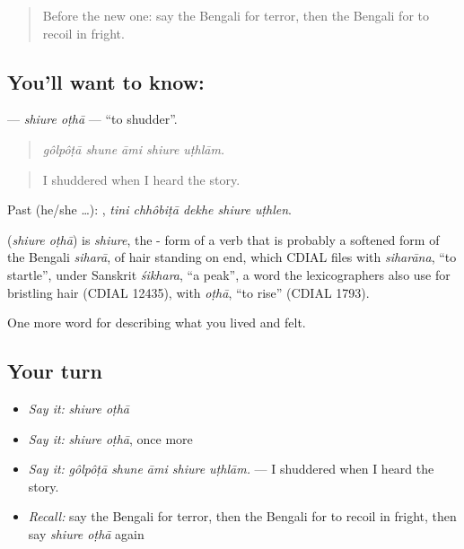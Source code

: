 \label{lesson:BN-C441-shiure-otha}



\begin{quote}
Before the new one: say the Bengali for terror, then the Bengali for to recoil in fright.
\end{quote}

\subsection*{You'll want to know:  }
\textbf{ } — \emph{shiure oṭhā} — \textquotedblleft{}to shudder\textquotedblright{}.

\begin{quote}
    
\end{quote}

\begin{quote}
\emph{gôlpôṭā shune āmi shiure uṭhlām.}
\end{quote}

\begin{quote}
I shuddered when I heard the story.
\end{quote}

Past (he/she …):     , \emph{tini chhôbiṭā dekhe shiure uṭhlen}.

\begin{cousinweb}
\textbf{ } (\emph{shiure oṭhā}) is \emph{shiure}, the - form of a verb that is probably a softened form of the Bengali \emph{siharā}, of hair standing on end, which CDIAL files with \emph{siharāna}, \textquotedblleft{}to startle\textquotedblright{}, under Sanskrit \emph{śikhara}, \textquotedblleft{}a peak\textquotedblright{}, a word the lexicographers also use for bristling hair (CDIAL 12435), with \emph{oṭhā}, \textquotedblleft{}to rise\textquotedblright{} (CDIAL 1793).
\end{cousinweb}

\begin{grammarlens}[title={What you've built}]
One more word for describing what you lived and felt.
\end{grammarlens}

\subsection*{Your turn}
\begin{itemize}
\raggedright
  \item \emph{Say it:} \emph{shiure oṭhā}
  \item \emph{Say it:} \emph{shiure oṭhā}, once more
  \item \emph{Say it:} \emph{gôlpôṭā shune āmi shiure uṭhlām.} — I shuddered when I heard the story.
  \item \emph{Recall:} say the Bengali for terror, then the Bengali for to recoil in fright, then say \emph{shiure oṭhā} again
\end{itemize}

